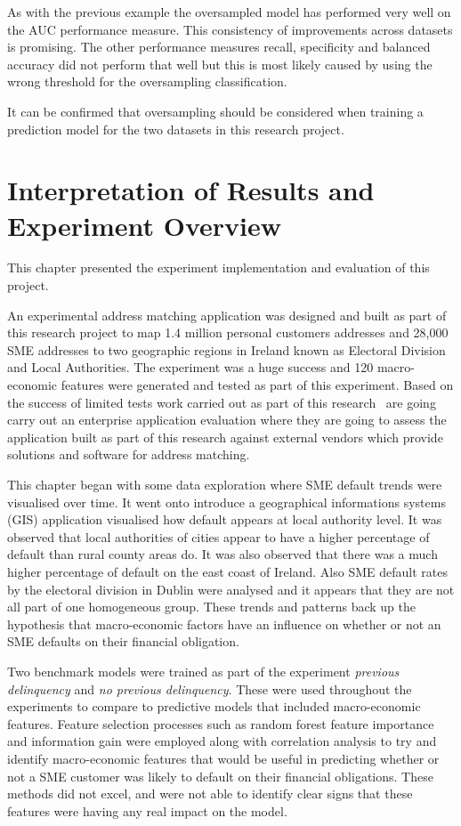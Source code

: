 As with the previous example the oversampled model has performed very well on the AUC performance measure. This consistency of improvements across datasets is promising. The other performance measures recall, specificity and balanced accuracy did not perform that well but this is most likely caused by using the wrong threshold for the oversampling classification. 

It can be confirmed that oversampling should be considered when training a prediction model for the two datasets in this research project.




\section{Interpretation of Results and Experiment Overview}
This chapter presented the experiment implementation and evaluation of this project. 

An experimental address matching application was designed and built as part of this research project to map 1.4 million personal customers addresses and 28,000 SME addresses to two geographic regions in Ireland known as Electoral Division and Local Authorities. The experiment was a huge success and 120 macro-economic features were generated and tested as part of this experiment. Based on the success of limited tests work carried out as part of this research \subjectname\ are going carry out an enterprise application evaluation where they are going to assess the application built as part of this research against external vendors which provide solutions and software for address matching.

This chapter began with some data exploration where SME default trends were visualised over time. It went onto introduce a geographical informations systems (GIS) application visualised how default appears at local authority level. It was observed that local authorities of cities appear to have a higher percentage of default than rural county areas do. It was also observed that there was a much higher percentage of default on the east coast of Ireland. Also SME default rates by the electoral division in Dublin were analysed and it appears that they are not all part of one homogeneous group. These trends and patterns back up the hypothesis that macro-economic factors have an influence on whether or not an SME defaults on their financial obligation.

Two benchmark models were trained as part of the experiment \textit{previous delinquency} and \textit{no previous delinquency}. These were used throughout the experiments to compare to predictive models that included macro-economic features. Feature selection processes such as random forest feature importance and information gain were employed along with correlation analysis to try and identify macro-economic features that would be useful in predicting whether or not a SME customer was likely to default on their financial obligations. These methods did not excel, and were not able to identify clear signs that these features were having any real impact on the model. 

